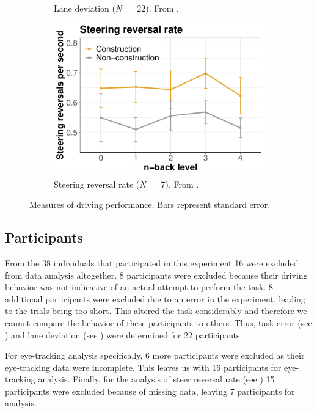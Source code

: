 \begin{figure}
\begin{subfigure}[b]{0.3\textwidth}
    \caption{Lane deviation (\textit{N}\ =\ 22). From \citet{Kelapanda2021}.}
    \label{fig:lane-deviation}
  \end{subfigure}
  \hfill
  \begin{subfigure}[b]{0.3\textwidth}
    \centering
    \includegraphics[width=\textwidth]{images/steering_reversal.pdf}
    \caption{Steering reversal rate (\textit{N}\ =\ 7). From \citet{Kelapanda2021}.}
    \label{fig:steering-reversal}
  \end{subfigure}
  \caption{Measures of driving performance. Bars represent standard error.}
  \label{fig:performance}
\end{figure}

\subsection{Participants}
From the 38 individuals that participated in this experiment 16 were excluded from data analysis altogether.
8 participants were excluded because their driving behavior was not indicative of an actual attempt to perform the task.
8 additional participants were excluded due to an error in the experiment, leading to the trials being too short.
This altered the task considerably and therefore we cannot compare the behavior of these participants to others.
Thus, task error (see \citealp{DeMooij2021}) and lane deviation (see \citealp{Kelapanda2021}) were determined for 22 participants. 

For eye-tracking analysis specifically, 6 more participants were excluded as their eye-tracking data were incomplete. 
This leaves us with 16 participants for eye-tracking analysis.
Finally, for the analysis of steer reversal rate (see \citealp{Kelapanda2021}) 15 participants were excluded because of missing data, leaving 7 participants for analysis.

